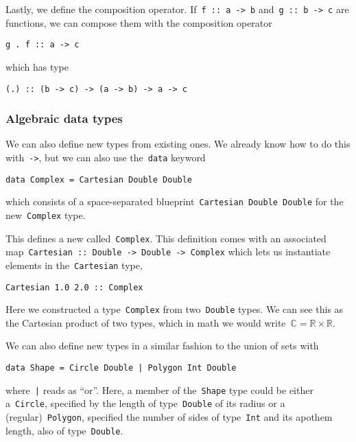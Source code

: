\documentclass[../TFG.tex]{subfiles}
\begin{document}
Lastly, we define the composition operator. If~\texttt{f :: a -> b}
and~\texttt{g :: b -> c} are functions, we can compose them with
the composition operator
\begin{verbatim}
g . f :: a -> c
\end{verbatim}
which has type
\begin{verbatim}
(.) :: (b -> c) -> (a -> b) -> a -> c
\end{verbatim}

\subsubsection{Algebraic data types}
We can also define new types from existing ones. We already know how to do this
with~\texttt{->}, but we can also use
the~\texttt{data} keyword
\begin{verbatim}
data Complex = Cartesian Double Double
\end{verbatim}
which consists of a space-separated blueprint~\texttt{Cartesian
Double Double} for the new~\texttt{Complex} type.

This defines a new called~\texttt{Complex}. This definition comes
with an associated
map~\texttt{Cartesian :: Double -> Double -> Complex} which lets us
instantiate elements in the~\texttt{Cartesian} type, \ie
\begin{verbatim}
Cartesian 1.0 2.0 :: Complex
\end{verbatim}

Here we constructed a type~\texttt{Complex} from
two~\texttt{Double} types. We can see this as the Cartesian product
of two types, which in math we would
write~\(\mathbb{C}=\mathbb{R}\times\mathbb{R}\).

We can also define new types in a similar fashion to the union of sets with
\begin{verbatim}
data Shape = Circle Double | Polygon Int Double
\end{verbatim}
where~\texttt{|} reads as ``or''. Here, a member of
the~\texttt{Shape} type could be either
a~\texttt{Circle}, specified by the length of
type~\texttt{Double} of its radius or a
(regular)~\texttt{Polygon}, specified the number of sides of
type~\texttt{Int} and its apothem length, also of
type~\texttt{Double}.
\end{document}
